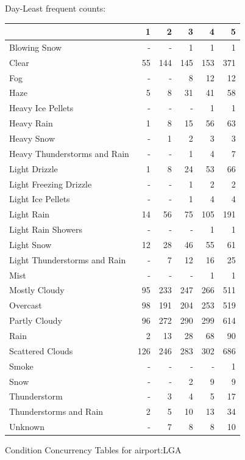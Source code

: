 \documentclass[11pt]{scrartcl}
\begin{document}
Day-Least frequent counts:
\begin{tabular}{lrrrrr}
\toprule
{} &    1 &    2 &    3 &    4 &    5 \\
\midrule
Blowing Snow                 &  - &  - &    1 &    1 &    1 \\
Clear                        &   55 &  144 &  145 &  153 &  371 \\
Fog                          &  - &  - &    8 &   12 &   12 \\
Haze                         &    5 &    8 &   31 &   41 &   58 \\
Heavy Ice Pellets            &  - &  - &  - &    1 &    1 \\
Heavy Rain                   &    1 &    8 &   15 &   56 &   63 \\
Heavy Snow                   &  - &    1 &    2 &    3 &    3 \\
Heavy Thunderstorms and Rain &  - &  - &    1 &    4 &    7 \\
Light Drizzle                &    1 &    8 &   24 &   53 &   66 \\
Light Freezing Drizzle       &  - &  - &    1 &    2 &    2 \\
Light Ice Pellets            &  - &  - &    1 &    4 &    4 \\
Light Rain                   &   14 &   56 &   75 &  105 &  191 \\
Light Rain Showers           &  - &  - &  - &    1 &    1 \\
Light Snow                   &   12 &   28 &   46 &   55 &   61 \\
Light Thunderstorms and Rain &  - &    7 &   12 &   16 &   25 \\
Mist                         &  - &  - &  - &    1 &    1 \\
Mostly Cloudy                &   95 &  233 &  247 &  266 &  511 \\
Overcast                     &   98 &  191 &  204 &  253 &  519 \\
Partly Cloudy                &   96 &  272 &  290 &  299 &  614 \\
Rain                         &    2 &   13 &   28 &   68 &   90 \\
Scattered Clouds             &  126 &  246 &  283 &  302 &  686 \\
Smoke                        &  - &  - &  - &  - &    1 \\
Snow                         &  - &  - &    2 &    9 &    9 \\
Thunderstorm                 &  - &    3 &    4 &    5 &   17 \\
Thunderstorms and Rain       &    2 &    5 &   10 &   13 &   34 \\
Unknown                      &  - &    7 &    8 &    8 &   10 \\
\bottomrule
\end{tabular}
Condition Concurrency Tables for airport:LGA
\end{document}
